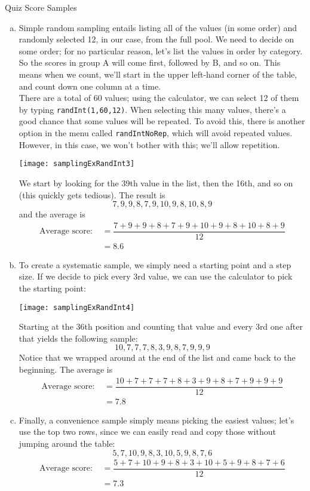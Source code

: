 \begin{example}[https://www.youtube.com/watch?v=Ix-PKoZrJks&list=PLfmpjsIzhzttL_Uec2nCbDRcAcUF7NKG8&index=5]{Quiz Score Samples}
\begin{enumerate}[(a)]
\item Simple random sampling entails listing all of the values (in some order) and randomly selected 12, in our case, from the full pool.  We need to decide on some order; for no particular reason, let's list the values in order by category.  So the scores in group A will come first, followed by B, and so on.  This means when we count, we'll start in the upper left-hand corner of the table, and count down one column at a time.\\

There are a total of 60 values; using the calculator, we can select 12 of them by typing \texttt{randInt(1,60,12)}.  When selecting this many values, there's a good chance that some values will be repeated.  To avoid this, there is another option in the menu called \texttt{randIntNoRep}, which will avoid repeated values.  However, in this case, we won't bother with this; we'll allow repetition.
\begin{center}
\texttt{[image: samplingExRandInt3]}
\end{center}
We start by looking for the 39th value in the list, then the 16th, and so on (this quickly gets tedious).  The result is
\[\boxed{7, 9, 9, 8, 7, 9, 10, 9, 8, 10, 8, 9}\]
and the average is
\begin{align*}
\textrm{Average score: } &= \dfrac{7+9+9+8+7+9+10+9+8+10+8+9}{12}\\
&= \boxed{8.6}
\end{align*}

\item To create a systematic sample, we simply need a starting point and a step size.  If we decide to pick every 3rd value, we can use the calculator to pick the starting point:
\begin{center}
\texttt{[image: samplingExRandInt4]}
\end{center}
Starting at the 36th position and counting that value and every 3rd one after that yields the following sample:
\[\boxed{10, 7, 7, 7, 8, 3, 9, 8, 7, 9, 9, 9}\]
Notice that we wrapped around at the end of the list and came back to the beginning.  The average is
\begin{align*}
\textrm{Average score: } &= \dfrac{10+7+7+7+8+3+9+8+7+9+9+9}{12}\\
&= \boxed{7.8}
\end{align*}

\item Finally, a convenience sample simply means picking the easiest values; let's use the top two rows, since we can easily read and copy those without jumping around the table:
\[\boxed{5, 7, 10, 9, 8, 3, 10, 5, 9, 8, 7, 6}\]
\begin{align*}
\textrm{Average score: } &= \dfrac{5+7+10+9+8+3+10+5+9+8+7+6}{12}\\
&= \boxed{7.3}
\end{align*}
\end{enumerate}
\end{example}

